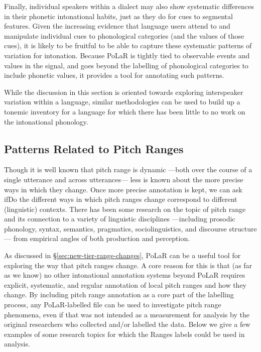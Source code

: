 \documentclass[11pt, twoside]{memoir}
\begin{document}
Finally, individual speakers within a dialect may also show systematic differences in their phonetic intonational habits, just as they do for cues to segmental features.  Given the increasing evidence that language users attend to and manipulate individual cues to phonological categories (and the values of those cues), it is likely to be fruitful to be able to capture these systematic patterns of variation for intonation.  Because PoLaR is tightly tied to observable events and values in the signal, and goes beyond the labelling of phonological categories to include phonetic values, it provides a tool for annotating such patterns.

While the discussion in this section is oriented towards exploring interspeaker variation within a language, similar methodologies can be used to build up a tonemic inventory for a language for which there has been little to no work on the intonational phonology.

\subsection{Patterns Related to Pitch Ranges}\label{sec:pitch-ranges}

Though it is well known that pitch range is dynamic —both over the course of a single utterance and across utterances— less is known about the more precise ways in which they change. Once more precise annotation is kept, we can ask ifDo the different ways in which pitch ranges change correspond to different (linguistic) contexts. There has been some research on the topic of pitch range and its connection to a variety of linguistic disciplines —including prosodic phonology, syntax, semantics, pragmatics, sociolinguistics, and discourse structure— from empirical angles of both production and perception.

As discussed in §\ref{sec:new-tier-range-changes}, PoLaR can be a useful tool for exploring the way that pitch ranges change. A core reason for this is that (as far as we know) no other intonational annotation systems beyond PoLaR requires explicit, systematic, and regular annotation of local pitch ranges and how they change. By including pitch range annotation as a core part of the labelling process, any PoLaR-labelled file can be used to investigate pitch range phenomena, even if that was not intended as a measurement for analysis by the original researchers who collected and/or labelled the data. Below we give a few examples of some research topics for which the Ranges labels could be used in analysis.
\end{document}
